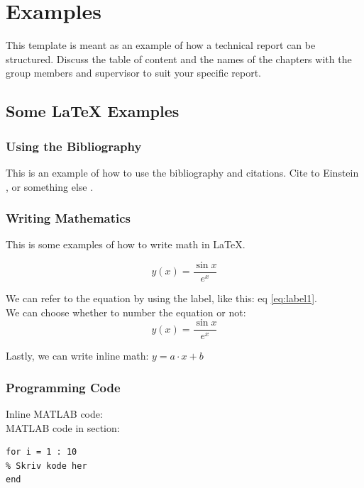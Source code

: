 \chapter{Examples}
This template is meant as an example
of how a technical report can be
structured. Discuss the table of content and the names of the chapters with the
group members and supervisor to suit your specific report.\\

\section{Some \LaTeX{} Examples}

\subsection{Using the Bibliography}

This is an example of how to use the bibliography and citations. Cite to Einstein \cite{einstein}, or something else \cite{dirac}.\\


\subsection{Writing Mathematics}

This is some examples of how to write math in \LaTeX.

\begin{equation}
    y(x) = \frac{\sin x}{e^x}
    \label{eq:label1}
\end{equation}

We can refer to the equation by using the label, like this: eq \ref{eq:label1}.\\

We can choose whether to number the equation or not:
\begin{equation*}
    y(x) = \frac{\sin x}{e^x}
\end{equation*}

Lastly, we can write inline math: $y = a \cdot x + b$ 

\subsection{Programming Code}

Inline MATLAB code: \\

MATLAB code in section:
\begin{lstlisting}
for i = 1 : 10
% Skriv kode her
end
\end{lstlisting}


